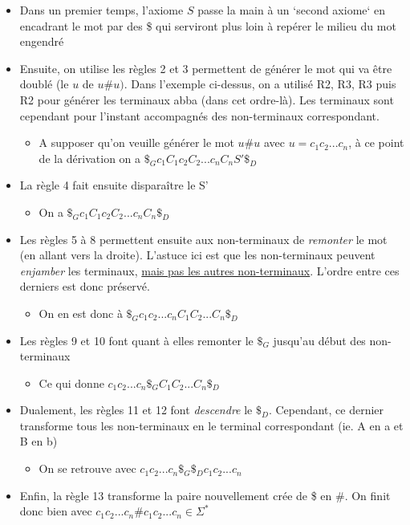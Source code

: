 \documentclass{article}[11pt]
\theoremstyle{definition}
\begin{document}
\begin{itemize}
\item Dans un premier temps, l'axiome $S$ passe la main à un `second axiome` en encadrant le mot par des \$ qui serviront plus loin à repérer le milieu du mot engendré
\item Ensuite, on utilise les règles 2 et 3 permettent de générer le mot qui va être doublé (le $u$ de $u\#u)$. Dans l'exemple ci-dessus, on a utilisé R2, R3, R3 puis R2 pour générer les terminaux abba (dans cet ordre-là). Les terminaux sont cependant pour l'instant accompagnés des non-terminaux correspondant.
\begin{itemize}
\item[] A supposer qu'on veuille générer le mot $u\#u$ avec $u = c_1c_2...c_n$, à ce point de la dérivation on a $\$_Gc_1C_1c_2C_2...c_nC_nS'\$_D$
\end{itemize}
\item La règle 4 fait ensuite disparaître le S'
\begin{itemize}
\item[] On a $\$_Gc_1C_1c_2C_2...c_nC_n\$_D$
\end{itemize}
\item Les règles 5 à 8 permettent ensuite aux non-terminaux de \textit{remonter} le mot (en allant vers la droite). L'astuce ici est que les non-terminaux peuvent \textit{enjamber} les terminaux, \underline{mais pas les autres non-terminaux}. L'ordre entre ces derniers est donc préservé.
\begin{itemize}
\item[] On en est donc à $\$_Gc_1c_2...c_nC_1C_2...C_n\$_D$
\end{itemize}
\item Les règles 9 et 10 font quant à elles remonter le $\$_G$ jusqu'au début des non-terminaux
\begin{itemize}
\item[] Ce qui donne $c_1c_2...c_n\$_GC_1C_2...C_n\$_D$
\end{itemize}
\item Dualement, les règles 11 et 12 font \textit{descendre} le $\$_D$. Cependant, ce dernier transforme tous les non-terminaux en le terminal correspondant (ie. A en a et B en b)
\begin{itemize}
\item[] On se retrouve avec $c_1c_2...c_n\$_G\$_Dc_1c_2...c_n$
\end{itemize}
\item Enfin, la règle 13 transforme la paire nouvellement crée de \$ en \#. On finit donc bien avec  $c_1c_2...c_n\#c_1c_2...c_n \in \Sigma^*$
\end{itemize}
\end{document}
